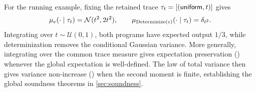 For the running example, fixing the retained
trace $\tau_t=[(\mathsf{uniform},t)]$ gives
\[
  \mu_{e}(\cdot\mid\tau_t)
    =\mathcal N(t^2,2t^2),
  \qquad
  \mu_{\operatorname{Determinize}(e)}(\cdot\mid\tau_t)
    =\delta_{t^2}.
\]
Integrating over $t\sim\mathcal U(0,1)$,
both programs have expected output $1/3$,
while determinization removes the conditional
Gaussian variance. More generally, integrating over the common
trace measure gives expectation preservation ()
whenever the global expectation is well-defined.
The law of total variance then gives variance
non-increase () when the second moment is finite,
establishing the global soundness theorems in
\cref{sec:soundness}.
